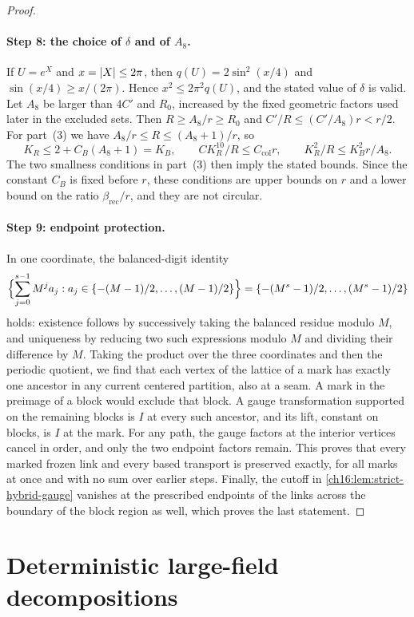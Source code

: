 \begin{proof}
\paragraph{Step 8: the choice of $\delta$ and of $A_8$.}
If $U=e^X$ and $x=\lvert X\rvert\le2\pi$, then $q(U)=2\sin^2(x/4)$ and $\sin(x/4)\ge x/(2\pi)$. Hence $x^2\le2\pi^2q(U)$, and the stated value of $\delta$ is valid. Let $A_8$ be larger than $4C'$ and $R_0$, increased by the fixed geometric factors used later in the excluded sets. Then $R\ge A_8/r\ge R_0$ and $C'/R\le(C'/A_8)r<r/2$. For part~(3) we have $A_8/r\le R\le(A_8+1)/r$, so
\[
 K_R\le2+C_B(A_8+1)=K_B,\qquad CK_R^{10}/R\le C_{\mathrm{col}}r,\qquad K_R^2/R\le K_B^2r/A_8.
\]
The two smallness conditions in part~(3) then imply the stated bounds. Since the constant $C_B$ is fixed before $r$, these conditions are upper bounds on $r$ and a lower bound on the ratio $\beta_{\mathrm{rec}}/r$, and they are not circular.

\paragraph{Step 9: endpoint protection.}
In one coordinate, the balanced-digit identity
\[
 \Bigl\{\sum_{j=0}^{s-1}M^ja_j:a_j\in\{-(M-1)/2,\ldots,(M-1)/2\}\Bigr\}
 =\{-(M^s-1)/2,\ldots,(M^s-1)/2\}
\]
holds: existence follows by successively taking the balanced residue modulo $M$, and uniqueness by reducing two such expressions modulo $M$ and dividing their difference by $M$. Taking the product over the three coordinates and then the periodic quotient, we find that each vertex of the lattice of a mark has exactly one ancestor in any current centered partition, also at a seam. A mark in the preimage of a block would exclude that block. A gauge transformation supported on the remaining blocks is $I$ at every such ancestor, and its lift, constant on blocks, is $I$ at the mark. For any path, the gauge factors at the interior vertices cancel in order, and only the two endpoint factors remain. This proves that every marked frozen link and every based transport is preserved exactly, for all marks at once and with no sum over earlier steps. Finally, the cutoff in \cref{ch16:lem:strict-hybrid-gauge} vanishes at the prescribed endpoints of the links across the boundary of the block region as well, which proves the last statement.
\end{proof}

\section{Deterministic large-field decompositions}\label{ch18:sec:decompositions}

